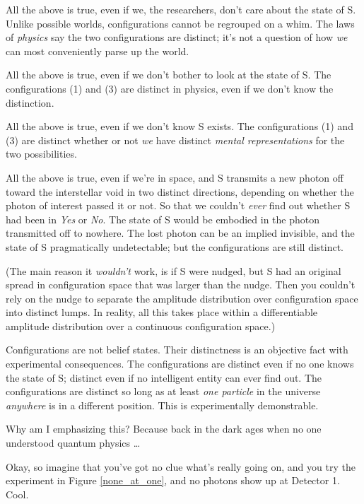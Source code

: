 {
 All the above is true, even if we, the researchers,
don't care about the state of S. Unlike possible
worlds, configurations cannot be regrouped on a whim. The laws of
\textit{physics} say the two configurations are distinct;
it's not a question of how \textit{we} can most
conveniently parse up the world.}

{
 All the above is true, even if we don't bother to
look at the state of S. The configurations (1) and (3) are distinct in
physics, even if we don't know the distinction.}

{
 All the above is true, even if we don't know S
exists. The configurations (1) and (3) are distinct whether or not
\textit{we} have distinct \textit{mental representations} for the two
possibilities.}

{
 All the above is true, even if we're in space, and
S transmits a new photon off toward the interstellar void in two
distinct directions, depending on whether the photon of interest passed
it or not. So that we couldn't \textit{ever} find out
whether S had been in \textit{Yes} or \textit{No}. The state of S would
be embodied in the photon transmitted off to nowhere. The lost photon
can be an implied invisible, and the state of S pragmatically
undetectable; but the configurations are still distinct.}

{
 (The main reason it \textit{wouldn't} work, is if
S were nudged, but S had an original spread in configuration space that
was larger than the nudge. Then you couldn't rely on
the nudge to separate the amplitude distribution over configuration
space into distinct lumps. In reality, all this takes place within a
differentiable amplitude distribution over a continuous configuration
space.)}

{
 Configurations are not belief states. Their distinctness is an
objective fact with experimental consequences. The configurations are
distinct even if no one knows the state of S; distinct even if no
intelligent entity can ever find out. The configurations are distinct
so long as at least \textit{one particle} in the universe
\textit{anywhere} is in a different position. This is experimentally
demonstrable.}

{
 Why am I emphasizing this? Because back in the dark ages when no
one understood quantum physics \ldots}


{
 Okay, so imagine that you've got no clue
what's really going on, and you try the experiment in
Figure \ref{none_at_one}, and no photons show up at Detector 1. Cool.}

